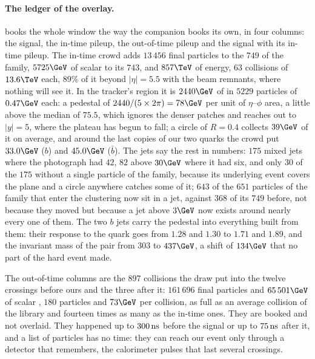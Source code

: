 \paragraph{The ledger of the overlay.}
\label{sec:crowd_on_the_road:overlay_ledger}
 books the whole window the
way the \CMSSW companion books its own, in four columns: the signal, the
in-time pileup, the out-of-time pileup and the signal with its in-time
pileup. The in-time crowd adds $13\,456$ final particles to the $749$ of
the family, $5725\GeV$ of scalar \pt to its $743$, and $857\TeV$ of
energy, $63$ collisions of $13.6\TeV$ each, $89\%$ of it beyond
$|\eta|=5.5$ with the beam remnants, where nothing will see it. In the
tracker's region it is $2440\GeV$ of \pt in $5229$
particles of $0.47\GeV$ each: a pedestal of $2440/(5\times2\pi)=78\GeV$
per unit of $\eta$--$\phi$ area, a little above the median \rhoPU of
$75.5$, which ignores the denser patches and reaches out to $|y|=5$,
where the plateau has begun to fall; a circle of $R=0.4$ collects
$39\GeV$ of it on average, and around the last copies of our two quarks
the crowd put $33.0\GeV$ ($b$) and $45.0\GeV$ ($\bar b$). The jets say
the rest in numbers: $175$ mixed jets where the photograph had $42$, $82$
above $30\GeV$ where it had six, and only $30$ of the $175$ without a
single particle of the family, because its underlying event covers the
plane and a circle anywhere catches some of it; $643$ of the $651$
particles of the family that enter the clustering now sit in a jet,
against $368$ of its $749$ before, not because they moved but because a
jet above $3\GeV$ now exists around nearly every one of them. The two $b$
jets carry the pedestal into everything built from them: their response
to the quark goes from $1.28$ and $1.30$ to $1.71$ and $1.89$, and the
invariant mass of the pair from $303$ to $437\GeV$, a shift of $134\GeV$
that no part of the hard event made.

The out-of-time columns are the $897$ collisions the draw put into the
twelve crossings before ours and the three after it: $161\,696$ final
particles and $65\,501\GeV$ of scalar \pt, $180$ particles and $73\GeV$
per collision, as full as an average collision of the library and
fourteen times as many as the in-time ones. They are booked and not
overlaid. They happened up to $300\,\mathrm{ns}$ before the signal or up to $75\,\mathrm{ns}$
after it, and a list of particles has no time: they can reach our event
only through a detector that remembers, the calorimeter pulses that last
several crossings.

